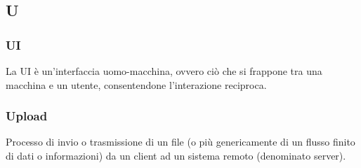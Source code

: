 \subsection*{\textbf{\hfill \Huge{U} \hfill}} 
\subsubsection*{UI}
La UI è un'interfaccia uomo-macchina, ovvero ciò che si frappone tra una macchina e un utente, consentendone l'interazione reciproca.

\subsubsection*{Upload}
Processo di invio o trasmissione di un file (o più genericamente di un flusso finito di dati o informazioni) da un client ad un sistema remoto (denominato server). 
